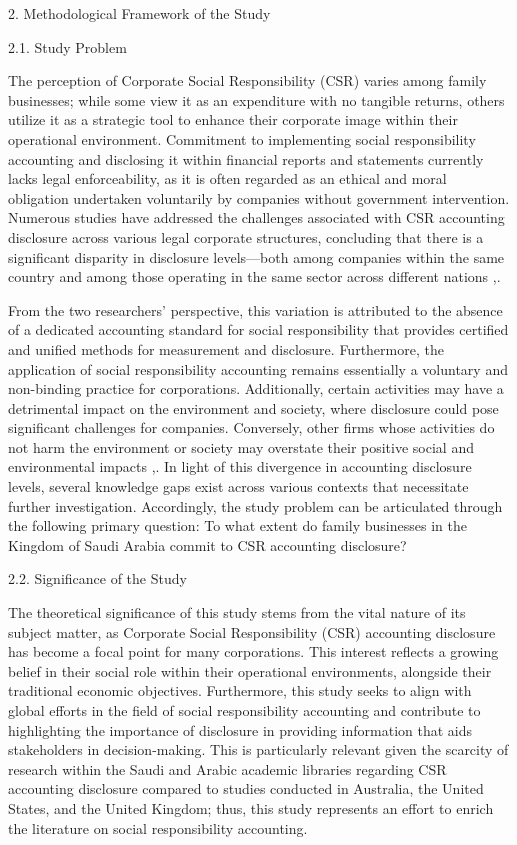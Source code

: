 \documentclass{default}
\begin{document}
2. Methodological Framework of the Study

2.1. Study Problem

The perception of Corporate Social Responsibility (CSR) varies among family businesses; while some view it as an expenditure with no tangible returns, others utilize it as a strategic tool to enhance their corporate image within their operational environment. Commitment to implementing social responsibility accounting and disclosing it within financial reports and statements currently lacks legal enforceability, as it is often regarded as an ethical and moral obligation undertaken voluntarily by companies without government intervention. Numerous studies have addressed the challenges associated with CSR accounting disclosure across various legal corporate structures, concluding that there is a significant disparity in disclosure levels—both among companies within the same country and among those operating in the same sector across different nations \cite{ref37},.

From the two researchers' perspective, this variation is attributed to the absence of a dedicated accounting standard for social responsibility that provides certified and unified methods for measurement and disclosure. Furthermore, the application of social responsibility accounting remains essentially a voluntary and non-binding practice for corporations. Additionally, certain activities may have a detrimental impact on the environment and society, where disclosure could pose significant challenges for companies. Conversely, other firms whose activities do not harm the environment or society may overstate their positive social and environmental impacts \cite{ref35},. In light of this divergence in accounting disclosure levels, several knowledge gaps exist across various contexts that necessitate further investigation. Accordingly, the study problem can be articulated through the following primary question: To what extent do family businesses in the Kingdom of Saudi Arabia commit to CSR accounting disclosure?

2.2. Significance of the Study

The theoretical significance of this study stems from the vital nature of its subject matter, as Corporate Social Responsibility (CSR) accounting disclosure has become a focal point for many corporations. This interest reflects a growing belief in their social role within their operational environments, alongside their traditional economic objectives. Furthermore, this study seeks to align with global efforts in the field of social responsibility accounting and contribute to highlighting the importance of disclosure in providing information that aids stakeholders in decision-making. This is particularly relevant given the scarcity of research within the Saudi and Arabic academic libraries regarding CSR accounting disclosure compared to studies conducted in Australia, the United States, and the United Kingdom; thus, this study represents an effort to enrich the literature on social responsibility accounting.
\end{document}
